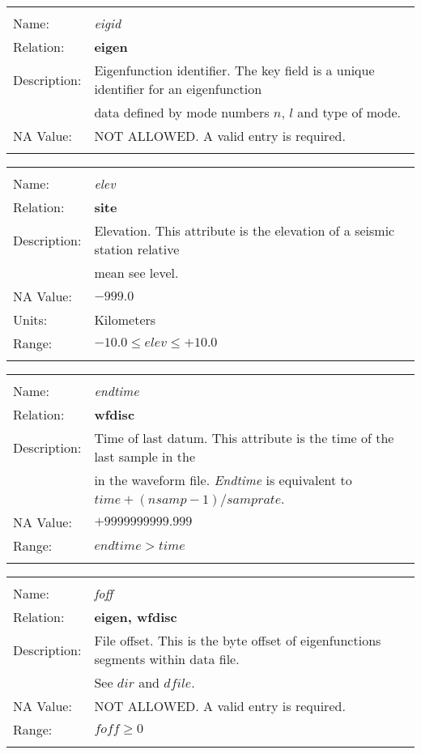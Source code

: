 \begin{tabular*}{6.5 in}{ll} \hline
\\
Name: & {\it eigid} \\
Relation: & {\bf eigen} \\
Description: & Eigenfunction identifier. The key field is a unique identifier for an eigenfunction \\
& data defined by mode numbers $n$, $l$ and type of mode. \\
NA Value: & NOT ALLOWED. A valid entry is required. \\
&\\
\end{tabular*}
\begin{tabular*}{6.5 in}{ll} \hline
\\
Name: & {\it elev} \\
Relation: & {\bf site} \\
Description: & Elevation. This attribute is the elevation of a seismic station relative \\
& mean see level. \\
NA Value: & $-999.0$ \\
Units: & Kilometers \\
Range: & $-10.0 \leq elev \leq +10.0$ \\
&\\
\end{tabular*}
\begin{tabular*}{6.5 in}{ll} \hline
\\
Name: & {\it endtime} \\
Relation: & {\bf wfdisc} \\
Description: & Time of last datum. This attribute is the time of the last sample in the \\
& in the waveform file. {\it Endtime} is equivalent to $time+(nsamp-1)/samprate$. \\
NA Value: & $+9999999999.999$ \\
Range: & $endtime > time$ \\
&\\
\end{tabular*}
\begin{tabular*}{6.5 in}{ll} \hline
\\
Name: & {\it foff} \\
Relation: & {\bf eigen, wfdisc} \\
Description: & File offset. This is the byte offset of eigenfunctions segments within data file. \\
& See $dir$ and $dfile$. \\
NA Value: & NOT ALLOWED. A valid entry is required. \\
Range: & $foff \geq  0$ \\
&\\
\end{tabular*}
